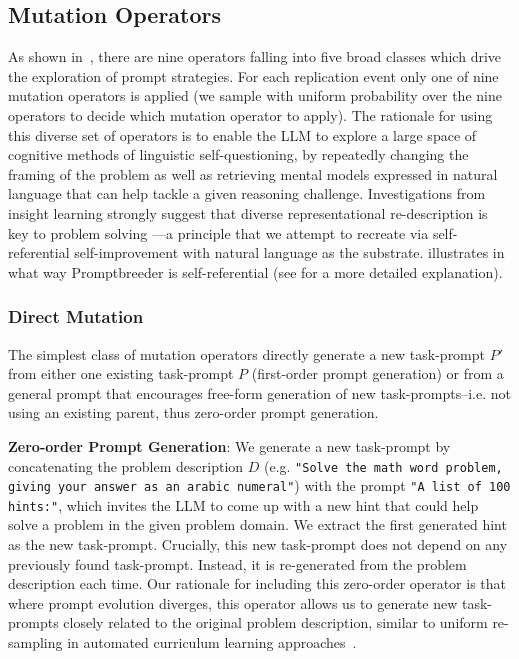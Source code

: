 \documentclass{article} %
\newcommand{\prompt}[1]{\footnotesize{\texttt{"#1"}}\normalsize}
\begin{document}
\subsection{Mutation Operators}
\label{sec:mutation}
As shown in~, there are nine operators falling into five broad classes which drive the exploration of prompt strategies. For each replication event only one of nine mutation operators is applied (we sample with uniform probability over the nine operators to decide which mutation operator to apply). The rationale for using this diverse set of operators is to enable the LLM to explore a large space of cognitive methods of linguistic self-questioning, by repeatedly changing the framing of the problem as well as retrieving mental models expressed in natural language that can help tackle a given reasoning challenge. Investigations from insight learning strongly suggest that diverse representational re-description is key to problem solving \citep{ollinger2009psychological}---a principle that we attempt to recreate via self-referential self-improvement with natural language as the substrate.  illustrates in what way Promptbreeder is self-referential (see  for a more detailed explanation).

\subsubsection{Direct Mutation}
\label{sec:direct}
The simplest class of mutation operators directly generate a new task-prompt $P'$ from either one existing task-prompt $P$ (first-order prompt generation) or from a general prompt that encourages free-form generation of new task-prompts--i.e. not using an existing parent, thus zero-order prompt generation.

\textbf{Zero-order Prompt Generation}: We generate a new task-prompt by concatenating the problem description $D$ (e.g. \prompt{Solve the math word problem, giving your answer as an arabic numeral}) with the prompt \prompt{A list of 100 hints:}, which invites the LLM to come up with a new hint that could help solve a problem in the given problem domain. We extract the first generated hint as the new task-prompt. Crucially, this new task-prompt does not depend on any previously found task-prompt. Instead, it is re-generated from the problem description each time. Our rationale for including this zero-order operator is that where prompt evolution diverges, this operator allows us to generate new task-prompts closely related to the original problem description, similar to uniform re-sampling in automated curriculum learning approaches~\citep{DBLP:conf/icml/JiangGR21,DBLP:conf/nips/JiangDPFGR21,DBLP:journals/corr/abs-2304-03442, DBLP:conf/icml/Parker-HolderJ022}. 
\end{document}

